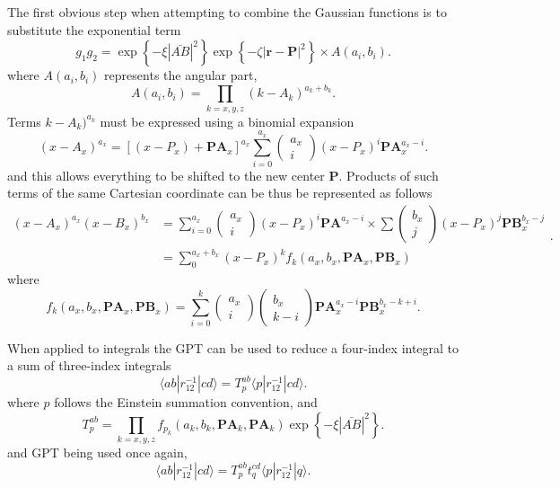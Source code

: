 The first obvious step when attempting to combine the Gaussian functions is to substitute the exponential term
\[
	g_1 g_2 = \exp \left\{ -\xi |\bar{AB}| ^2  \right\} \exp \left\{ -\zeta |\boldsymbol{r}-\boldsymbol{P}| ^2 \right\} \times A(a_i,b_i)
.\] 
where $A(a_i,b_i)$ represents the angular part,
 \[
	 A(a_i, b_i) = \prod_{k=x,y,z} (k-A_k)^{a_k + b_k} 
.\] 
Terms $k-A_k)^{a_k}$ must be expressed using a binomial expansion
 \[
	 (x-A_x)^{a_x} = [ (x-P_x) + \boldsymbol{PA}_x]^{a_x} \sum_{i=0}^{a_x} 
	 \begin{pmatrix}
	 	a_x \\
		i
	 \end{pmatrix}
	 (x-P_x)^i \boldsymbol{PA}_x ^{a_x-i}
.\] 
and this allows everything to be shifted to the new center $\boldsymbol{P}$. Products of such terms of the same Cartesian coordinate can be thus be represented as follows
\[
\begin{aligned}
	(x-A_x)^{a_x} (x-B_x)^{b_x} &= \sum_{i=0}^{a_x}
	\begin{pmatrix}
		a_x \\
		i
	\end{pmatrix}
	(x-P_x)^i \boldsymbol{PA} ^{a_x - i}  \times \sum
	\begin{pmatrix}
		b_x \\
		j
	\end{pmatrix}
	(x-P_x)^j \boldsymbol{PB}_x ^{b_x-j} \\
				    &= \sum_0^{a_x + b_x} (x-P_x)^k f_k(a_x,b_x,\boldsymbol{PA}_x, \boldsymbol{PB}_x)
\end{aligned}
.\] 
where
\[
	f_k(a_x,b_x,\boldsymbol{PA}_x,\boldsymbol{PB}_x) = \sum_{i=0}^k 
	\begin{pmatrix}
		a_x \\
		i
	\end{pmatrix}
	\begin{pmatrix}
		b_x \\
		k-i
	\end{pmatrix}
	\boldsymbol{PA}_x^{a_x - i} \boldsymbol{PB}_x^{b_x - k + i}
.\] 


When applied to integrals the GPT can be used to reduce a four-index integral to a sum of three-index integrals
\[
	\langle ab | r_{12}^{-1} | cd \rangle = T_p^{ab} \langle p | r_{12}^{-1} | cd \rangle 
.\] 
where $p$ follows the Einstein summation convention, and
 \[
	 T_p^{ab} = \prod_{k=x,y,z} f_{p_k} (a_k,b_k,\boldsymbol{PA}_k, \boldsymbol{PA}_k) \exp \left\{ - \xi |\bar{AB}|^2 \right\} 
.\] 
and GPT being used once again,
\[
	\langle ab | r_{12}^{-1} | cd \rangle = T_p^{ab} t_q^{cd} \langle p | r_{12}^{-1} | q \rangle  
.\] 


